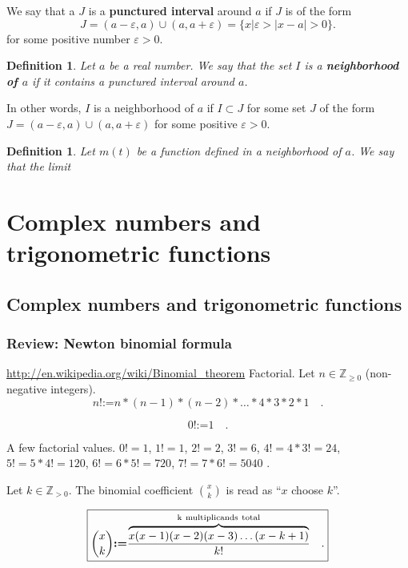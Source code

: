 \documentclass[12pt]{book}
\newcommand{\eqdef}{\textbf{:=}}
\newcommand{\importantFormula}[1]{\begin{equation} \boxed{#1} \end{equation}}
\newtheorem{definition}[theorem]{Definition}
\renewcommand{\emph}{\textbf}
\begin{document}
We say that a $J$ is a \emph{punctured interval} around $a$ if $J$ is of the form 
\[
J= (a-\varepsilon,a)\cup (a, a+\varepsilon)=\{x| \varepsilon>|x-a|>0\}.
\]
for some positive number $\varepsilon>0$.
\begin{definition}
Let $a$ be a real number. We say that the set $I$ is a \emph{neighborhood of $a$} if it contains a punctured interval around $a$.
\end{definition}
In other words,  $I$  is a neighborhood of $a$  if $I\subset J$ for some set $J$ of the form $ J= (a-\varepsilon,a)\cup (a, a+\varepsilon)$ for some positive $\varepsilon>0$.
\begin{definition}
Let $m(t)$ be a function defined in a neighborhood of $a$.  We say that the limit $ $
\end{definition}
\section{}\label{secTangentDef}

\chapter{Complex numbers and trigonometric functions}

\section{Complex numbers and trigonometric functions}
\subsection{Review: Newton binomial formula}\label{secNewtonBinomialReview}
\url{http://en.wikipedia.org/wiki/Binomial_theorem}
 Factorial. Let $n\in \mathbb Z_{\geq 0}$ (non-negative integers).
\[
n!\eqdef n*(n-1)*(n-2)*\dots *4*3*2*1 \quad  .
\]

\[0!\eqdef 1  \quad .
\]

A few factorial values. $0!=1$, $1!=1$, $2!=2$, $3!=6$, $4!=4*3!=24$, $5!=5*4!=120$, $6!=6*5!=720$, $7!=7*6!=5040$  \quad .

 Let $k\in \mathbb Z_{>0}$. The binomial coefficient $\binom{x}{k}$ is read as ``$x$ choose $k$''.

\importantFormula{\label{eqBinomialCoeffDefinition}
\binom{x}{k}\eqdef \frac{ \overbrace{ x(x-1)(x-2)(x-3)\dots (x-k+1)}^{\mathrm{k~multiplicands~total}} } {k!} \quad .
}
\end{document}
